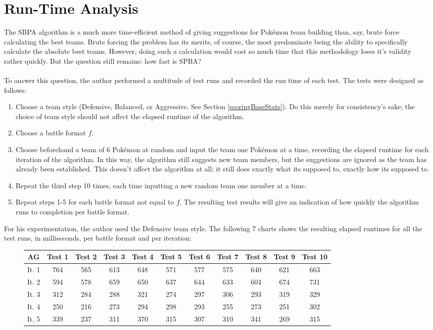 \documentclass{article}
\begin{document}
\section{Run-Time Analysis}
The SBPA algorithm is a much more time-efficient method of giving suggestions for Pok\'emon team building than, say, brute force calculating the best teams. Brute forcing the problem has its merits, of course, the most predominate being the ability to specifically calculate the absolute best teams. However, doing such a calculation would cost so much time that this methodology loses it's validity rather quickly. But the question still remains: how fast is SPBA?\\\\
To answer this question, the author performed a multitude of test runs and recorded the run time of each test. The tests were designed as follows:
\begin{enumerate}
	\item Choose a team style (Defensive, Balanced, or Aggressive. See Section \ref{scoringBaseStats}). Do this merely for consistency's sake; the choice of team style should not affect the elapsed runtime of the algorithm.  
	\item Choose a battle format $f$.
	\item Choose beforehand a team of 6 Pok\'emon at random and input the team one Pok\'emon at a time, recording the elapsed runtime for each iteration of the algorithm. In this way, the algorithm still suggests new team members, but the suggestions are ignored as the team has already been established. This doesn't affect the algorithm at all; it still does exactly what its supposed to, exactly how its supposed to.
	\item Repeat the third step 10 times, each time inputting a new random team one member at a time.
	\item Repeat steps 1-5 for each battle format not equal to $f$. The resulting test results will give an indication of how quickly the algorithm runs to completion per battle format.
\end{enumerate}
For his experimentation, the author used the Defensive team style. The following 7 charts shows the resulting elapsed runtimes for all the test runs, in milliseconds, per battle format and per iteration:
\begin{figure}[H]
	\begin{tabular}{c||c|c|c|c|c|c|c|c|c|c}
		AG&Test 1&Test 2&Test 3&Test 4&Test 5&Test 6&Test 7&Test 8&Test 9&Test 10\\
		\hline\hline
		It. 1&764&565&613&648&571&577&575&640&621&663\\
		It. 2&594&578&659&650&637&644&633&604&674&731\\
		It. 3&312&284&288&321&274&297&306&293&319&329\\
		It. 4&250&216&273&294&298&293&255&273&251&302\\
		It. 5&339&237&311&370&315&307&310&341&269&315\\
	\end{tabular}
	\centering
\end{figure}
\end{document}
